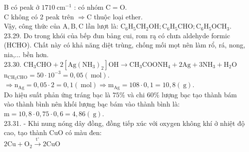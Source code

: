 \documentclass[10pt]{article}
\begin{document}
B có peak ở $1710 \mathrm{~cm}^{-1}$ : có nhóm $\mathrm{C}=\mathrm{O}$.\\
C không có 2 peak trên $\Rightarrow \mathrm{C}$ thuộc loại ether.\\
Vậy, công thức của $\mathrm{A}, \mathrm{B}, \mathrm{C}$ lần lượt là: $\mathrm{C}_{6} \mathrm{H}_{5} \mathrm{CH}_{2} \mathrm{OH} ; \mathrm{C}_{6} \mathrm{H}_{5} \mathrm{CHO} ; \mathrm{C}_{6} \mathrm{H}_{5} \mathrm{OCH}_{3}$.\\
23.29. Do trong khói của bếp đun bång cui, rom rą có chưa aldehyde formic (HCHO). Chất này có khả năng diệt trùng, chống mối mọt nên làm rổ, rá, nong, nia,... bền hơn.\\
23.30. $\mathrm{CH}_{3} \mathrm{CHO}+2\left[\mathrm{Ag}\left(\mathrm{NH}_{3}\right)_{2}\right] \mathrm{OH} \longrightarrow \mathrm{CH}_{3} \mathrm{COONH}_{4}+2 \mathrm{Ag}+3 \mathrm{NH}_{3}+\mathrm{H}_{2} \mathrm{O}$\\
$\mathrm{n}_{\mathrm{CH}_{3} \mathrm{CHO}}=50 \cdot 10^{-3}=0,05(\mathrm{~mol})$.\\
$\Rightarrow \mathrm{n}_{\mathrm{Ag}}=0,05 \cdot 2=0,1(\mathrm{~mol}) \Rightarrow \mathrm{m}_{\mathrm{Ag}}=108 \cdot 0,1=10,8(\mathrm{~g})$.\\
Do hiệu suất phản ứng tráng bạc là $75 \%$ và chi $60 \%$ lượng bạc tạo thành bám vào thành bình nên khối lượng bąc bám vào thành bình là:\\
$\mathrm{m}=10,8 \cdot 0,75 \cdot 0,6=4,86(\mathrm{~g})$.\\
23.31. - Khi nung nóng dây đồng, đồng tiếp xúc với oxygen không khí ở nhiệt độ cao, tạo thành CuO có màu đen:\\
$2 \mathrm{Cu}+\mathrm{O}_{2} \xrightarrow{\mathrm{t}^{\circ}} 2 \mathrm{CuO}$
\end{document}
